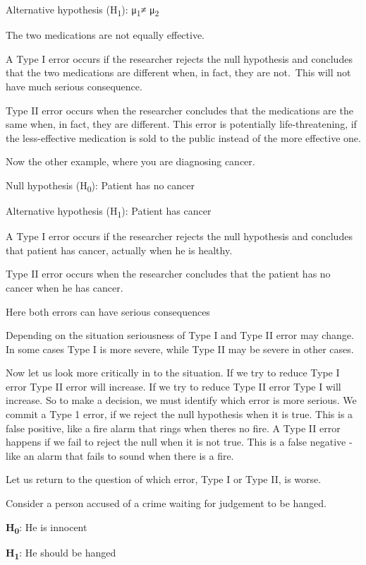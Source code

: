 \documentclass[
]{book}
\begin{document}
Alternative hypothesis (H\textsubscript{1}): μ\textsubscript{1}≠ μ\textsubscript{2}

The two medications are not equally effective.

A Type I error occurs if the researcher rejects the null hypothesis and concludes that the two medications are different when, in fact, they are not.~This will not have much serious consequence.

Type II error occurs when the researcher concludes that the medications are the same when, in fact, they are different.
This error is potentially life-threatening, if the less-effective medication is sold to the public instead of the more effective one.

Now the other example, where you are diagnosing cancer.

Null hypothesis (H\textsubscript{0}): Patient has no cancer

Alternative hypothesis (H\textsubscript{1}): Patient has cancer

A Type I error occurs if the researcher rejects the null hypothesis and concludes that patient has cancer, actually when he is healthy.

Type II error occurs when the researcher concludes that the patient has no cancer when he has cancer.

Here both errors can have serious consequences

Depending on the situation seriousness of Type I and Type II error may change. In some cases Type I is more severe, while Type II may be severe in other cases.

Now let us look more critically in to the situation. If we try to reduce Type I error Type II error will increase. If we try to reduce Type II error Type I will increase. So to make a decision, we must identify which error is more serious. We commit a Type 1 error, if we reject the
null hypothesis when it is true. This is a false positive, like a fire alarm that rings when there\textquotesingle s no fire. A Type II error happens if we fail to reject the null when it is not true. This is a false negative - like an alarm that fails to sound when there is a fire.

Let us return to the question of which error, Type I or Type II, is worse.

Consider a person accused of a crime waiting for judgement to be hanged.

\textbf{H\textsubscript{0}}: He is innocent

\textbf{H\textsubscript{1}}: He should be hanged
\end{document}
